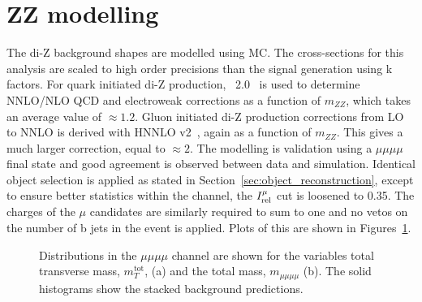 \section{ZZ modelling}
\label{sec:zz_modelling}

The di-Z background shapes are modelled using \ac{MC}.
The cross-sections for this analysis are scaled to high order precisions than the signal generation using k factors.
For quark initiated di-Z production, \POWHEG~2.0~\cite{Nason:2004rx,Frixione:2007vw,Alioli:2010xd,Jezo:2015aia} is used to determine \ac{NNLO}/\ac{NLO} \ac{QCD} and electroweak corrections as a function of $m_{ZZ}$, which takes an average value of $\approx 1.2$.
Gluon initiated di-Z production corrections from \ac{LO} to \ac{NNLO} is derived with HNNLO v2~\cite{PhysRevLett.98.222002}, again as a function of $m_{ZZ}$.
This gives a much larger correction, equal to $\approx 2$.
The modelling is validation using a $\mu\mu\mu\mu$ final state and good agreement is observed between data and simulation.
Identical object selection is applied as stated in Section~\ref{sec:object_reconstruction}, except to ensure better statistics within the channel, the $I_{\text{rel}}^{\mu}$ cut is loosened to 0.35.
The charges of the $\mu$ candidates are similarly required to sum to one and no vetos on the number of b jets in the event is applied.
Plots of this are shown in Figures~\ref{fig:4tau_mmmm}. \\

\begin{figure}[!hbtp]
\centering
\caption{Distributions in the $\mu\mu\mu\mu$ channel are shown for the variables total transverse mass, $m_{T}^{\text{tot}}$, (a) and the total mass, $m_{\mu\mu\mu\mu}$ (b). The solid histograms show the stacked background predictions.}
\label{fig:4tau_mmmm}
\end{figure}


